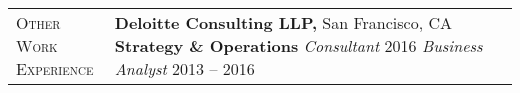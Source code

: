 \documentclass[11pt]{article}
\begin{document}
\begin{tabularx}{\textwidth}{@{}Y Z@{}}
	\textsc{Other Work \newline Experience} \vspace{20pt} & 
	\textbf{Deloitte Consulting LLP,} San Francisco, CA
	\vspace{0pt} \newline
	\textbf{Strategy \& Operations} 
	\vspace{3pt} \newline
	\textit{Consultant} \hfill 2016
	\vspace{0pt} \newline
	\textit{Business Analyst} \hfill 2013 -- 2016
	\vspace{20pt} \\


\end{tabularx}
\end{document}
